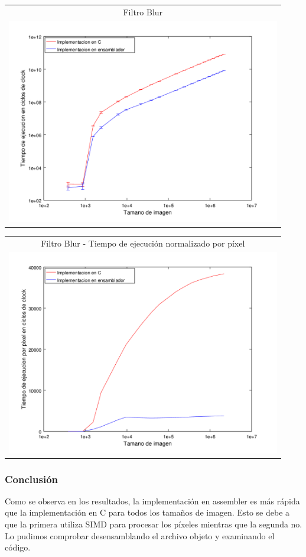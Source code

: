	{\centering \begin{tabular}{c}
      {\small Filtro Blur} \\
      \includegraphics[width=12cm]{../exp/graficos/exp1-blur-c_vs_asm.png} \\
    \end{tabular}}

   	{\centering \begin{tabular}{c}
      {\small Filtro Blur - Tiempo de ejecución normalizado por píxel} \\
      \includegraphics[width=12cm]{../exp/graficos/exp1-blur-tiempo_por_pixel.png} \\
    \end{tabular}}


	\subsubsection{Conclusión} 
		Como se observa en los resultados, la implementación en assembler es más rápida que la implementación en C para todos los tamaños de imagen. Esto se debe a que la primera utiliza SIMD para procesar los píxeles mientras que la segunda no. Lo pudimos comprobar desensamblando el archivo objeto y examinando el código. 


